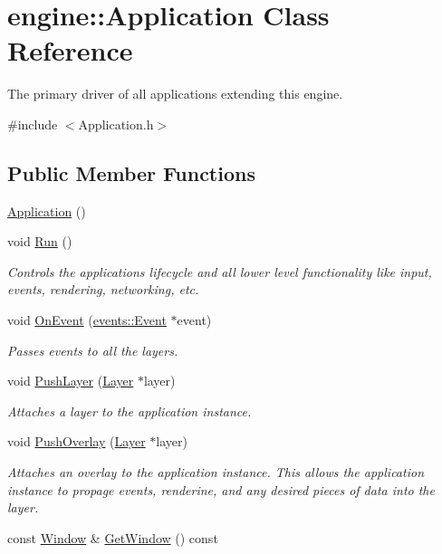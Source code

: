 \hypertarget{classengine_1_1Application}{}\section{engine\+:\+:Application Class Reference}
\label{classengine_1_1Application}


The primary driver of all applications extending this engine.  




{\ttfamily \#include $<$Application.\+h$>$}

\subsection*{Public Member Functions}
\begin{DoxyCompactItemize}
\item 
\hyperlink{classengine_1_1Application_a9740cd2e55318cbc5684a6c4c2f3304f}{Application} ()
\item 
void \hyperlink{classengine_1_1Application_a4dcdf08d920f7f63013a25cb1e80438b}{Run} ()
\begin{DoxyCompactList}\small\item\em Controls the applications lifecycle and all lower level functionality like input, events, rendering, networking, etc. \end{DoxyCompactList}\item 
void \hyperlink{classengine_1_1Application_a093e14152fc1eda1b5eba682a2b4afd9}{On\+Event} (\hyperlink{classengine_1_1events_1_1Event}{events\+::\+Event} $\ast$event)
\begin{DoxyCompactList}\small\item\em Passes events to all the layers. \end{DoxyCompactList}\item 
void \hyperlink{classengine_1_1Application_adb129a86a6cdbd80b25094d08605d213}{Push\+Layer} (\hyperlink{classengine_1_1Layer}{Layer} $\ast$layer)
\begin{DoxyCompactList}\small\item\em Attaches a layer to the application instance. \end{DoxyCompactList}\item 
\mbox{\label{classengine_1_1Application_a8dab10f6982032021b2091e2a96fdfc2}} 
void \hyperlink{classengine_1_1Application_a8dab10f6982032021b2091e2a96fdfc2}{Push\+Overlay} (\hyperlink{classengine_1_1Layer}{Layer} $\ast$layer)
\begin{DoxyCompactList}\small\item\em Attaches an overlay to the application instance. This allows the application instance to propage events, renderine, and any desired pieces of data into the layer. \end{DoxyCompactList}\item 
const \hyperlink{classengine_1_1Window}{Window} \& \hyperlink{classengine_1_1Application_a0c66a3ff294bcc497bb2e8eb7330124c}{Get\+Window} () const
\end{DoxyCompactItemize}
